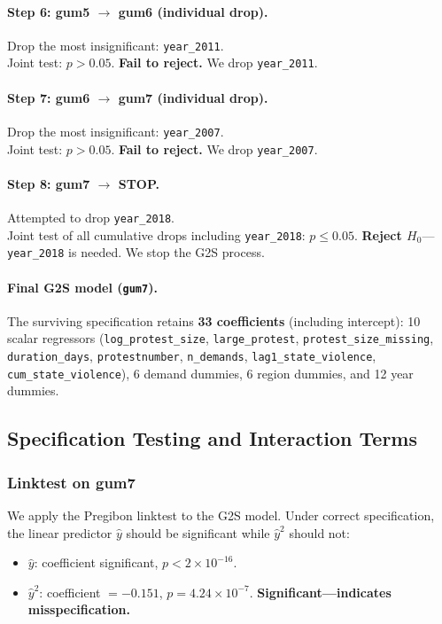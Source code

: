 \documentclass[12pt,a4paper]{article}
\begin{document}
\paragraph{Step 6: gum5 $\to$ gum6 (individual drop).}
Drop the most insignificant: \texttt{year\_2011}.\\
Joint test: $p > 0.05$. \textbf{Fail to reject.} We drop \texttt{year\_2011}.

\paragraph{Step 7: gum6 $\to$ gum7 (individual drop).}
Drop the most insignificant: \texttt{year\_2007}.\\
Joint test: $p > 0.05$. \textbf{Fail to reject.} We drop \texttt{year\_2007}.

\paragraph{Step 8: gum7 $\to$ STOP.}
Attempted to drop \texttt{year\_2018}.\\
Joint test of all cumulative drops including \texttt{year\_2018}: $p \leq 0.05$. \textbf{Reject $H_0$}---\texttt{year\_2018} is needed. We stop the G2S process.

\paragraph{Final G2S model (\texttt{gum7}).}
The surviving specification retains \textbf{33 coefficients} (including intercept): 10 scalar regressors (\texttt{log\_protest\_size}, \texttt{large\_protest}, \texttt{protest\_size\_missing}, \texttt{duration\_days}, \texttt{protestnumber}, \texttt{n\_demands}, \texttt{lag1\_state\_violence}, \texttt{cum\_state\_violence}), 6 demand dummies, 6 region dummies, and 12 year dummies.

\subsection{Specification Testing and Interaction Terms}
\label{sec:interactions}

\subsubsection{Linktest on gum7}

We apply the Pregibon linktest to the G2S model. Under correct specification, the linear predictor $\hat{y}$ should be significant while $\hat{y}^2$ should not:
\begin{itemize}
  \item $\hat{y}$: coefficient significant, $p < 2 \times 10^{-16}$. \checkmark
  \item $\hat{y}^2$: coefficient $= -0.151$, $p = 4.24 \times 10^{-7}$. \textbf{Significant---indicates misspecification.}
\end{itemize}
\end{document}
